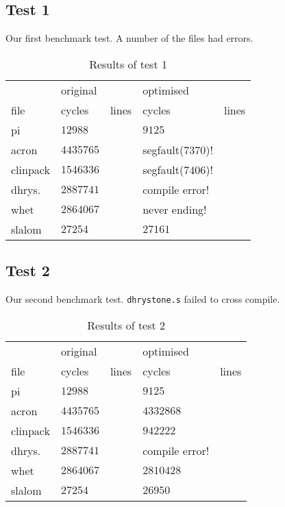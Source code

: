 \subsection{Test 1}

Our first benchmark test. A number of the files had errors.

\begin{table}[ht]
\centering
\begin{tabular}{l l l l l}
\toprule
        &original           &               &optimised          &             \\
file    &cycles     &lines  &cycles     &lines\\
\midrule
pi      &$12988$            &               &$9125$             &             \\
acron   &$4435765$          &               &segfault($7370$)!  &             \\
clinpack&$1546336$          &               &segfault($7406$)!  &             \\
dhrys.  &$2887741$          &               &compile error!     &             \\
whet    &$2864067$          &               &never ending!      &             \\
slalom  &$27254$            &               &$27161$            &             \\
\bottomrule
\end{tabular}
\caption{Results of test 1}
\label{tab:test1}
\end{table}


\subsection{Test 2}

Our second benchmark test. \texttt{dhrystone.s} failed to cross compile.

\begin{table}[ht]
\centering
\begin{tabular}{l l l l l}
\toprule
        &original           &               &optimised          &             \\
file    &cycles     &lines  &cycles     &lines\\
\midrule
pi      &$12988$            &               &$9125$             &             \\
acron   &$4435765$          &               &$4332868$  &             \\
clinpack&$1546336$          &               &$942222$  &             \\
dhrys.  &$2887741$          &               &compile error!     &             \\
whet    &$2864067$          &               &$2810428$      &             \\
slalom  &$27254$            &               &$26950$            &             \\
\bottomrule
\end{tabular}
\caption{Results of test 2}
\label{tab:test2}
\end{table}

